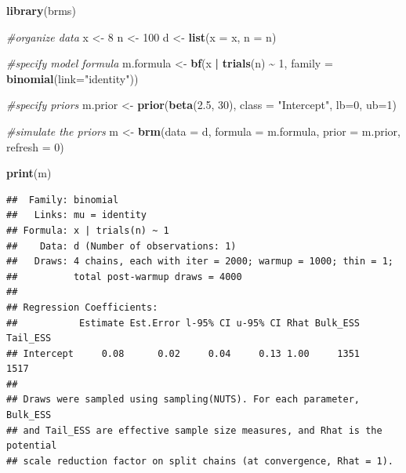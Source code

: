 \documentclass[
]{book}
\newenvironment{Shaded}{\begin{snugshade}}{\end{snugshade}}
\newcommand{\AttributeTok}[1]{\textcolor[rgb]{0.13,0.29,0.53}{#1}}
\newcommand{\CommentTok}[1]{\textcolor[rgb]{0.56,0.35,0.01}{\textit{#1}}}
\newcommand{\DecValTok}[1]{\textcolor[rgb]{0.00,0.00,0.81}{#1}}
\newcommand{\FloatTok}[1]{\textcolor[rgb]{0.00,0.00,0.81}{#1}}
\newcommand{\FunctionTok}[1]{\textcolor[rgb]{0.13,0.29,0.53}{\textbf{#1}}}
\newcommand{\NormalTok}[1]{#1}
\newcommand{\OtherTok}[1]{\textcolor[rgb]{0.56,0.35,0.01}{#1}}
\newcommand{\SpecialCharTok}[1]{\textcolor[rgb]{0.81,0.36,0.00}{\textbf{#1}}}
\newcommand{\StringTok}[1]{\textcolor[rgb]{0.31,0.60,0.02}{#1}}
\begin{document}
\begin{Shaded}
\begin{Highlighting}[]
\FunctionTok{library}\NormalTok{(brms)}

\CommentTok{\#organize data}
\NormalTok{x }\OtherTok{\textless{}{-}} \DecValTok{8}
\NormalTok{n }\OtherTok{\textless{}{-}} \DecValTok{100}
\NormalTok{d }\OtherTok{\textless{}{-}} \FunctionTok{list}\NormalTok{(}\AttributeTok{x =}\NormalTok{ x, }\AttributeTok{n =}\NormalTok{ n)}

\CommentTok{\#specify model formula}
\NormalTok{m.formula }\OtherTok{\textless{}{-}} \FunctionTok{bf}\NormalTok{(x }\SpecialCharTok{|} \FunctionTok{trials}\NormalTok{(n) }\SpecialCharTok{\textasciitilde{}} \DecValTok{1}\NormalTok{,}
                \AttributeTok{family =} \FunctionTok{binomial}\NormalTok{(}\AttributeTok{link=}\StringTok{"identity"}\NormalTok{))}

\CommentTok{\#specify priors}
\NormalTok{m.prior }\OtherTok{\textless{}{-}} \FunctionTok{prior}\NormalTok{(}\FunctionTok{beta}\NormalTok{(}\FloatTok{2.5}\NormalTok{, }\DecValTok{30}\NormalTok{), }\AttributeTok{class =} \StringTok{"Intercept"}\NormalTok{, }\AttributeTok{lb=}\DecValTok{0}\NormalTok{, }\AttributeTok{ub=}\DecValTok{1}\NormalTok{)}
              
\CommentTok{\#simulate the priors}
\NormalTok{m }\OtherTok{\textless{}{-}} \FunctionTok{brm}\NormalTok{(}\AttributeTok{data =}\NormalTok{ d,}
         \AttributeTok{formula =}\NormalTok{ m.formula,}
         \AttributeTok{prior =}\NormalTok{ m.prior,}
         \AttributeTok{refresh =} \DecValTok{0}\NormalTok{)}

\FunctionTok{print}\NormalTok{(m)}
\end{Highlighting}
\end{Shaded}

\begin{verbatim}
##  Family: binomial 
##   Links: mu = identity 
## Formula: x | trials(n) ~ 1 
##    Data: d (Number of observations: 1) 
##   Draws: 4 chains, each with iter = 2000; warmup = 1000; thin = 1;
##          total post-warmup draws = 4000
## 
## Regression Coefficients:
##           Estimate Est.Error l-95% CI u-95% CI Rhat Bulk_ESS Tail_ESS
## Intercept     0.08      0.02     0.04     0.13 1.00     1351     1517
## 
## Draws were sampled using sampling(NUTS). For each parameter, Bulk_ESS
## and Tail_ESS are effective sample size measures, and Rhat is the potential
## scale reduction factor on split chains (at convergence, Rhat = 1).
\end{verbatim}
\end{document}
